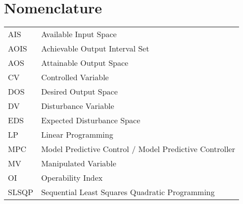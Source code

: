 \maketitle
\makecoverpage

\pagestyle{plain}
\thispagestyle{plain}





\tableofcontents
\newpage
\listoffigures{}
\newpage
\listoftables{}
\newpage
\chapter*{Nomenclature}

\begin{tabular}{ll}
  AIS & Available Input Space \\
  AOIS & Achievable Output Interval Set \citep{limaphd} \\
  AOS & Attainable Output Space \\
  CV  & Controlled Variable \\
  DOS & Desired Output Space \\
  DV  & Disturbance Variable \\
  EDS & Expected Disturbance Space \\
  LP  & Linear Programming \\
  MPC & Model Predictive Control / Model Predictive Controller \\
  MV  & Manipulated Variable \\
  OI  & Operability Index \citep{vinsonphd} \\
  SLSQP & Sequential Least Squares Quadratic Programming \\
\end{tabular}

\newpage

